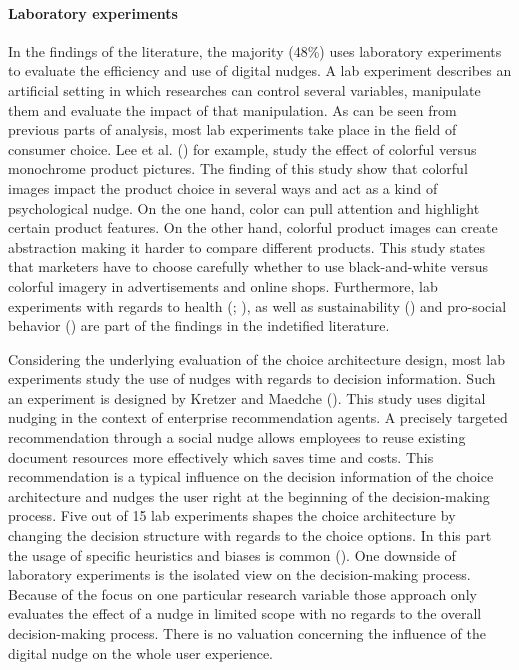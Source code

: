 \paragraph{Laboratory experiments}
In the findings of the literature, the majority (48\%) uses laboratory experiments to evaluate the efficiency and use of digital nudges. A lab experiment describes an artificial setting in which researches can control several variables, manipulate them and evaluate the impact of that manipulation. As can be seen from previous parts of analysis, most lab experiments take place in the field of consumer choice. Lee et al. (\citeyear{lee_monochrome_2014}) for example, study the effect of colorful versus monochrome product pictures. The finding of this study show that colorful images impact the product choice in several ways and act as a kind of psychological nudge.
On the one hand, color can pull attention and highlight certain product features. On the other hand, colorful product images can create abstraction making it harder to compare different products. This study states that marketers have to choose carefully whether to use black-and-white versus colorful imagery in advertisements and online shops.
Furthermore, lab experiments with regards to health (\cite{laran_nonconscious_2018}; \cite{langley_should_2015}), as well as sustainability (\cite{bruns_can_2018}) and pro-social behavior (\cite{zarghamee_nudging_2017}) are part of the findings in the indetified literature. 

Considering the underlying evaluation of the choice architecture design, most lab experiments study the use of nudges with regards to decision information. Such an experiment is designed by Kretzer and Maedche (\citeyear{kretzer_designing_2018}). This study uses digital nudging in the context of enterprise recommendation agents. A precisely targeted recommendation through a social nudge allows employees to reuse existing document resources more effectively which saves time and costs. This recommendation is a typical influence on the decision information of the choice architecture and nudges the user right at the beginning of the decision-making process.  %
Five out of 15 lab experiments shapes the choice architecture by changing the decision structure with regards to the choice options. In this part the usage of specific heuristics and biases is common (\cite{tversky_judgment_1974}).
One downside of laboratory experiments is the isolated view on the decision-making process. Because of the focus on one particular research variable those approach only evaluates the effect of a nudge in limited scope with no regards to the overall decision-making process. There is no valuation concerning the influence of the digital nudge on the whole user experience. %
 
